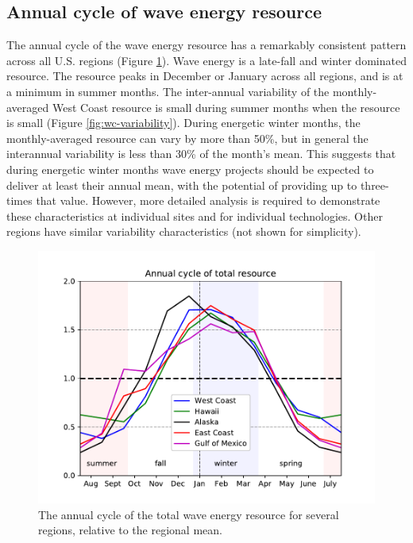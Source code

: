\subsection{Annual cycle of wave energy resource}

The annual cycle of the wave energy resource has a remarkably consistent pattern across all U.S. regions (Figure \ref{fig:annual-cycle}). Wave energy is a late-fall and winter dominated resource. The resource peaks in December or January across all regions, and is at a minimum in summer months. The inter-annual variability of the monthly-averaged West Coast resource is small during summer months when the resource is small (Figure \ref{fig:wc-variability}). During energetic winter months, the monthly-averaged resource can vary by more than 50\%, but in general the interannual variability is less than 30\% of the month's mean. This suggests that during energetic winter months wave energy projects should be expected to deliver at least their annual mean, with the potential of providing up to three-times that value.  However, more detailed analysis is required to demonstrate these characteristics at individual sites and for individual technologies. Other regions have similar variability characteristics (not shown for simplicity).

\begin{figure}[ht]
  \centering
  \includegraphics[width=\textwidth]{../fig/AnnualCycle01.pdf}
  \caption[Wave resource annual cycle.]{The annual cycle of the total wave energy resource for several regions, relative to the regional mean.}
  \label{fig:annual-cycle}
\end{figure}


